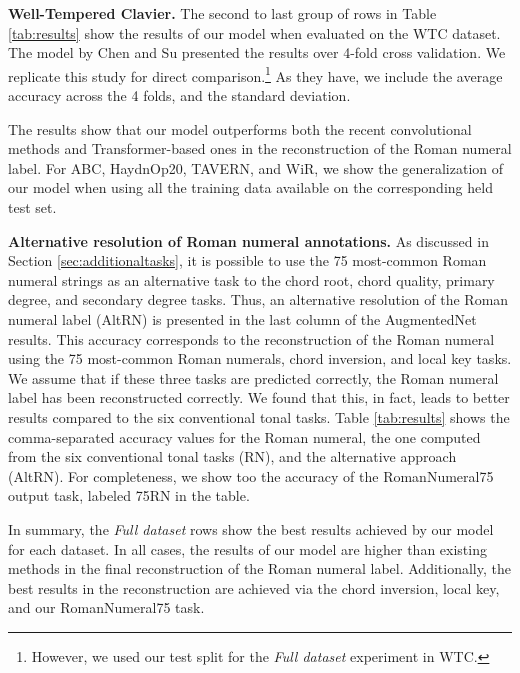 \documentclass{article}
\begin{document}
\textbf{Well-Tempered Clavier.}
The second to last group of rows in Table \ref{tab:results} show the results of our model when evaluated on the WTC dataset.
The model by Chen and Su \cite{chen_attend_2021} presented the results over 4-fold cross validation. We replicate this study for direct comparison.\footnote{However, we used our test split for the \emph{Full dataset} experiment in WTC.} As they have, we include the average accuracy across the 4 folds, and the standard deviation. 

The results show that our model outperforms both the recent convolutional methods \cite{micchi_not_2020} and Transformer-based ones \cite{chen_attend_2021} in the reconstruction of the Roman numeral label. 
For ABC, HaydnOp20, TAVERN, and WiR, we show the generalization of our model when using all the training data available on the corresponding held test set. 

\textbf{Alternative resolution of Roman numeral annotations.}
As discussed in Section \ref{sec:additionaltasks}, it is possible to use the 75 most-common Roman numeral strings as an alternative task to the chord root, chord quality, primary degree, and secondary degree tasks. 
Thus, an alternative resolution of the Roman numeral label (AltRN) is presented in the last column of the AugmentedNet results. This accuracy corresponds to the reconstruction of the Roman numeral using the 75 most-common Roman numerals, chord inversion, and local key tasks. 
We assume that if these three tasks are predicted correctly, the Roman numeral label has been reconstructed correctly.
We found that this, in fact, leads to better results compared to the six conventional tonal tasks. 
Table \ref{tab:results} shows the comma-separated accuracy values for the Roman numeral, the one computed from the six conventional tonal tasks (RN), and the alternative approach (AltRN). For completeness, we show too the accuracy of the RomanNumeral75 output task, labeled 75RN in the table.

In summary, the \emph{Full dataset} rows show the best results achieved by our model for each dataset. In all cases, the results of our model are higher than existing methods in the final reconstruction of the Roman numeral label. Additionally, the best results in the reconstruction are achieved via the chord inversion, local key, and our RomanNumeral75 task.
\end{document}
